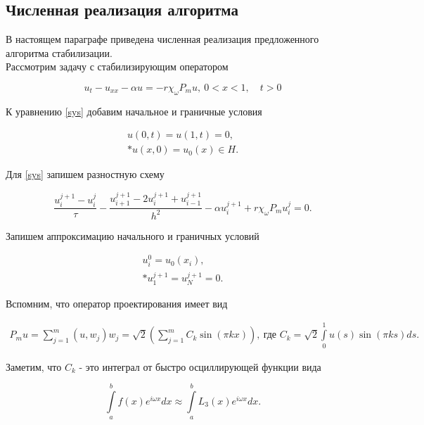 \subsection{Численная реализация алгоритма}
\vspace{1em}

В настоящем параграфе приведена численная реализация предложенного алгоритма 
стабилизации.\\

Рассмотрим задачу с стабилизирующим оператором

\begin{equation}\label{sys}
    u_t - u_{xx} - \alpha u = -r\chi_{\omega}P_m u, \ 0 < x < 1, \quad t > 0
\end{equation}

К уравнению \eqref{sys} добавим начальное и граничные условия

\begin{gather}\label{s_control}
    u(0, t) = u(1, t) = 0, \\*
    u(x, 0) = u_{0}(x) \in H. \nonumber
\end{gather}

Для \eqref{sys} запишем разностную схему

\begin{equation}\label{scheme}
    \frac{u^{j + 1}_i - u^j_i}{\tau} - \frac{u_{i + 1}^{j + 1} - 
    2u_{i}^{j + 1} + u_{i - 1}^{j + 1}}{h^2} - \alpha u_{i}^{j + 1} + 
    r\chi_{\omega}P_m u^j_i = 0.
\end{equation}

Запишем аппроксимацию начального и граничных условий

\begin{gather}
    u_i^0 = u_0(x_i), \\*
    u_1^{j+1} = u_N^{j+1} = 0. \nonumber
\end{gather}

Вспомним, что оператор проектирования имеет вид

\begin{gather*}
    P_m u = \sum \limits_{j=1}^{m} {(u, w_j) w_j} = 
    \sqrt{2} (\sum \limits_{j=1}^{m} {C_k \sin{(\pi k x)}}), \ \text{где }
    C_k = \sqrt{2} \int\limits_0^1{u(s)\sin{(\pi k s)} ds}.
\end{gather*}

Заметим, что $C_k$ - это интеграл от быстро осциллирующей функции вида

\begin{equation}
    \int\limits_a^b{f(x) e^{i\omega x} dx} \approx \int\limits_a^b{L_3(x)
    e^{i\omega x} dx}.
\end{equation}


